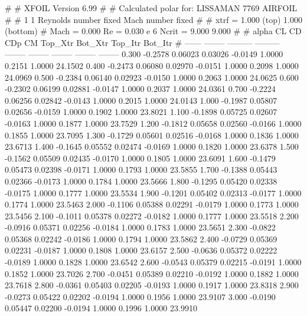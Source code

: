 #  
#       XFOIL         Version 6.99
#  
# Calculated polar for: LISSAMAN 7769 AIRFOIL                           
#  
# 1 1 Reynolds number fixed          Mach number fixed         
#  
# xtrf =   1.000 (top)        1.000 (bottom)  
# Mach =   0.000     Re =     0.030 e 6     Ncrit =   9.000  9.000
#  
#   alpha    CL        CD       CDp       CM     Top_Xtr  Bot_Xtr  Top_Itr  Bot_Itr
#  ------ -------- --------- --------- -------- -------- -------- -------- --------
   0.300  -0.2578   0.06023   0.03026  -0.0149   1.0000   0.2151   1.0000  24.1502
   0.400  -0.2473   0.06080   0.02970  -0.0151   1.0000   0.2098   1.0000  24.0969
   0.500  -0.2384   0.06140   0.02923  -0.0150   1.0000   0.2063   1.0000  24.0625
   0.600  -0.2302   0.06199   0.02881  -0.0147   1.0000   0.2037   1.0000  24.0361
   0.700  -0.2224   0.06256   0.02842  -0.0143   1.0000   0.2015   1.0000  24.0143
   1.000  -0.1987   0.05807   0.02656  -0.0159   1.0000   0.1902   1.0000  23.8021
   1.100  -0.1898   0.05725   0.02607  -0.0163   1.0000   0.1877   1.0000  23.7529
   1.200  -0.1812   0.05658   0.02560  -0.0166   1.0000   0.1855   1.0000  23.7095
   1.300  -0.1729   0.05601   0.02516  -0.0168   1.0000   0.1836   1.0000  23.6713
   1.400  -0.1645   0.05552   0.02474  -0.0169   1.0000   0.1820   1.0000  23.6378
   1.500  -0.1562   0.05509   0.02435  -0.0170   1.0000   0.1805   1.0000  23.6091
   1.600  -0.1479   0.05473   0.02398  -0.0171   1.0000   0.1793   1.0000  23.5855
   1.700  -0.1388   0.05443   0.02366  -0.0173   1.0000   0.1784   1.0000  23.5666
   1.800  -0.1295   0.05420   0.02338  -0.0175   1.0000   0.1777   1.0000  23.5534
   1.900  -0.1201   0.05402   0.02313  -0.0177   1.0000   0.1774   1.0000  23.5463
   2.000  -0.1106   0.05388   0.02291  -0.0179   1.0000   0.1773   1.0000  23.5456
   2.100  -0.1011   0.05378   0.02272  -0.0182   1.0000   0.1777   1.0000  23.5518
   2.200  -0.0916   0.05371   0.02256  -0.0184   1.0000   0.1783   1.0000  23.5651
   2.300  -0.0822   0.05368   0.02242  -0.0186   1.0000   0.1794   1.0000  23.5862
   2.400  -0.0729   0.05369   0.02231  -0.0187   1.0000   0.1808   1.0000  23.6157
   2.500  -0.0636   0.05372   0.02222  -0.0189   1.0000   0.1828   1.0000  23.6542
   2.600  -0.0543   0.05379   0.02215  -0.0191   1.0000   0.1852   1.0000  23.7026
   2.700  -0.0451   0.05389   0.02210  -0.0192   1.0000   0.1882   1.0000  23.7618
   2.800  -0.0361   0.05403   0.02205  -0.0193   1.0000   0.1917   1.0000  23.8318
   2.900  -0.0273   0.05422   0.02202  -0.0194   1.0000   0.1956   1.0000  23.9107
   3.000  -0.0190   0.05447   0.02200  -0.0194   1.0000   0.1996   1.0000  23.9910
